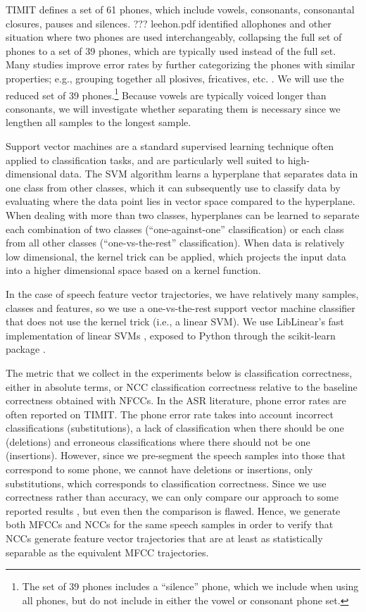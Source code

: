 TIMIT defines a set of 61 phones,
which include vowels, consonants,
consonantal closures, pauses and silences.
??? leehon.pdf identified
allophones and
other situation where two phones
are used interchangeably,
collapsing the full set of phones
to a set of 39 phones,
which are typically used
instead of the full set.
Many studies improve error rates
by further categorizing
the phones with similar properties;
e.g., grouping together all
plosives, fricatives, etc.
\citep{lopes2011}.
We will use the reduced set of 39 phones.\footnote{
  The set of 39 phones includes a ``silence'' phone,
  which we include when using all phones,
  but do not include in either the vowel or consonant
  phone set.}
Because vowels are typically voiced
longer than consonants,
we will investigate whether
separating them is necessary
since we lengthen all samples
to the longest sample.

Support vector machines are a standard
supervised learning technique
often applied to classification tasks,
and are particularly well suited
to high-dimensional data.
The SVM algorithm learns a hyperplane
that separates data
in one class from other classes,
which it can subsequently use
to classify data
by evaluating where the data point
lies in vector space compared to the hyperplane.
When dealing with more than two classes,
hyperplanes can be learned to separate
each combination of two classes
(``one-against-one'' classification)
or each class from all other classes
(``one-vs-the-rest'' classification).
When data is relatively low dimensional,
the kernel trick can be applied,
which projects the input data
into a higher dimensional space
based on a kernel function.

In the case of speech feature vector trajectories,
we have relatively many samples,
classes and features,
so we use a one-vs-the-rest
support vector machine classifier
that does not use the kernel trick
(i.e., a linear SVM).
We use LibLinear's fast implementation
of linear SVMs \citep{fan2008},
exposed to Python through
the scikit-learn package
\citep{pedregosa2011}.

The metric that we collect
in the experiments below
is classification correctness,
either in absolute terms,
or NCC classification correctness
relative to the baseline correctness
obtained with NFCCs.
In the ASR literature,
phone error rates are often
reported on TIMIT.
The phone error rate
takes into account
incorrect classifications
(substitutions),
a lack of classification
when there should be one
(deletions)
and erroneous classifications
where there should not be one
(insertions).
However, since we pre-segment
the speech samples into
those that correspond to some phone,
we cannot have deletions or insertions,
only substitutions,
which corresponds to classification correctness.
Since we use correctness
rather than accuracy,
we can only compare our approach
to some reported results
\citep{lopes2011},
but even then the comparison is flawed.
Hence, we generate both MFCCs
and NCCs for the same speech samples
in order to verify that
NCCs generate feature vector trajectories
that are at least as statistically separable
as the equivalent MFCC trajectories.

